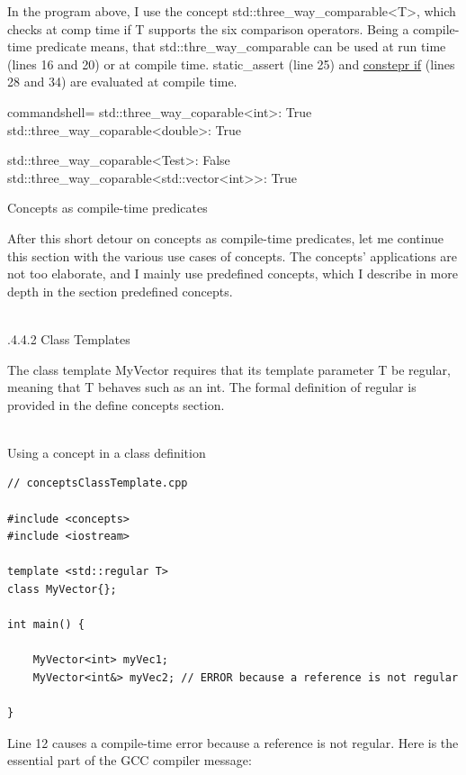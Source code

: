 In the program above, I use the concept std::three\_way\_comparable<T>, which checks at comp time if T supports the six comparison operators. Being a compile-time predicate means, that std::thre\_way\_comparable can be used at run time (lines 16 and 20) or at compile time. static\_assert (line 25) and \href{https://en.cppreference.com/w/cpp/language/if}{constepr if} (lines 28 and 34) are evaluated at compile time.

\begin{tcblisting}{commandshell={}}
std::three_way_coparable<int>: True
std::three_way_coparable<double>: True

std::three_way_coparable<Test>: False
std::three_way_coparable<std::vector<int>>: True
\end{tcblisting}

\begin{center}
Concepts as compile-time predicates
\end{center}

After this short detour on concepts as compile-time predicates, let me continue this section with the various use cases of concepts. The concepts’ applications are not too elaborate, and I mainly use predefined concepts, which I describe in more depth in the section predefined concepts.

\hspace*{\fill} \\ %
.4.4.2\hspace{0.2cm} Class Templates

The class template MyVector requires that its template parameter T be regular, meaning that T behaves such as an int. The formal definition of regular is provided in the define concepts section.

\hspace*{\fill} \\ %
\noindent
Using a concept in a class definition
\begin{lstlisting}[style=styleCXX]
// conceptsClassTemplate.cpp

#include <concepts>
#include <iostream>

template <std::regular T>
class MyVector{};

int main() {

	MyVector<int> myVec1;
	MyVector<int&> myVec2; // ERROR because a reference is not regular

}
\end{lstlisting}

Line 12 causes a compile-time error because a reference is not regular. Here is the essential part of the GCC compiler message:

